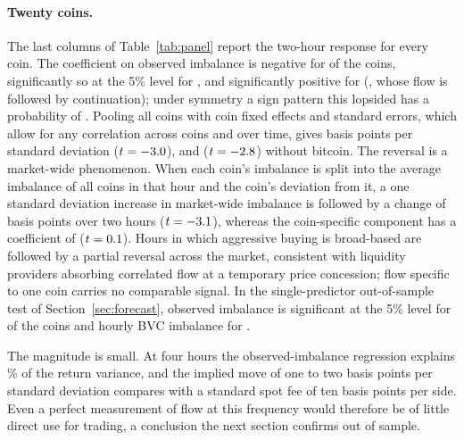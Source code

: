 \begin{table}[t]
\centering\caption{Return response to observed flow with controls and against the best proxy}\label{tab:controls}
\resizebox{\textwidth}{!}{}
\end{table}

\paragraph{Twenty coins.} The last columns of Table~\ref{tab:panel} report the two-hour response for
every coin. The coefficient on observed imbalance is negative for \panelNnegtwo{} of the \panelN{}
coins, significantly so at the 5\% level for \panelNsigNegtwo{}, and significantly positive for
\panelNsigPostwo{} (\panelSigPosCoins, whose flow is followed by continuation); under symmetry a sign
pattern this lopsided has a probability of \panelSignPtwo.
Pooling all coins with coin fixed effects and \citet{driscoll1998} standard errors, which allow for
any correlation across coins and over time, gives \poolAllBtwo{} basis points per standard deviation
($t=-3.0$), and \poolExBtwo{} ($t=-2.8$) without bitcoin. The reversal is a market-wide
phenomenon. When each coin's imbalance is split into the average imbalance of all coins in that hour
and the coin's deviation from it, a one standard deviation increase in market-wide imbalance is
followed by a change of \poolMkttwo{} basis points over two hours ($t=-3.1$), whereas the
coin-specific component has a coefficient of \poolCointwo{} ($t=0.1$). Hours in which
aggressive buying is broad-based are followed by a partial reversal across the market, consistent
with liquidity providers absorbing correlated flow at a temporary price concession; flow specific to
one coin carries no comparable signal. In the single-predictor out-of-sample test of
Section~\ref{sec:forecast}, observed imbalance is significant at the 5\% level for \panelSpSig{} of
the \panelN{} coins and hourly BVC imbalance for \panelSpBvcSig.

The magnitude is small. At four hours the observed-imbalance regression explains
\BTCfrRtwoFour\% of the return variance, and the implied move of one to two basis points per standard
deviation compares with a standard spot fee of ten basis points per side. Even a perfect measurement
of flow at this frequency would therefore be of little direct use for trading, a conclusion the next
section confirms out of sample.
